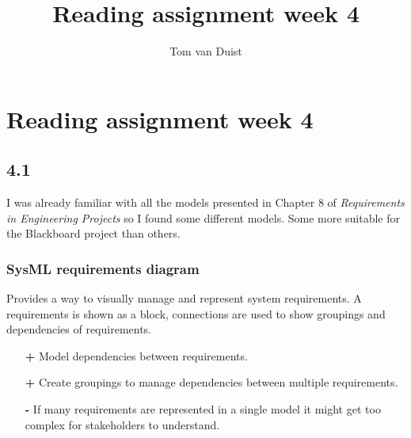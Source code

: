 

\title{Reading assignment week 4}
\newcommand{\TitelAbbr}{}
\newcommand{\Version}{0.1}



\what{}
\supervisors{}
\author{Tom van Duist}




\maketitle
\clearpage


\chapter*{Reading assignment week 4}

\section*{4.1}
I was already familiar with all the models presented in Chapter 8 of \emph{Requirements	in Engineering Projects}\cite{req_en_book} so I found some different models. Some more suitable for the Blackboard project than others.

\subsection*{SysML requirements diagram \cite{sysml}}
Provides a way to visually manage and represent system requirements. A requirements is shown as a block, connections are used to show groupings and dependencies of requirements.
\begin{itemize}
	\item[\textbf{+}] Model dependencies between requirements.
	\item[\textbf{+}] Create groupings to manage dependencies between multiple requirements.
	\item[\textbf{-}] If many requirements are represented in a single model it might get too complex for stakeholders to understand.
\end{itemize}

